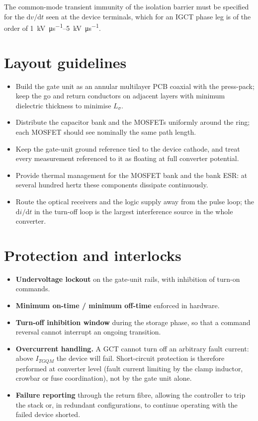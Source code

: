 \documentclass[11pt,a4paper]{report}
\begin{document}
The common-mode transient immunity of the isolation barrier must be specified for
the $\mathrm{d}v/\mathrm{d}t$ seen at the device terminals, which for an IGCT
phase leg is of the order of \SIrange{1}{5}{\kilo\volt\per\micro\second}.

\section{Layout guidelines}

\begin{itemize}[nosep]
  \item Build the gate unit as an annular multilayer PCB coaxial with the
        press-pack; keep the go and return conductors on adjacent layers with
        minimum dielectric thickness to minimise $L_{\sigma}$.
  \item Distribute the capacitor bank and the MOSFETs uniformly around the ring;
        each MOSFET should see nominally the same path length.
  \item Keep the gate-unit ground reference tied to the device cathode, and treat
        every measurement referenced to it as floating at full converter
        potential.
  \item Provide thermal management for the MOSFET bank and the bank ESR: at
        several hundred hertz these components dissipate continuously.
  \item Route the optical receivers and the logic supply away from the pulse
        loop; the $\mathrm{d}i/\mathrm{d}t$ in the turn-off loop is the largest
        interference source in the whole converter.
\end{itemize}

\section{Protection and interlocks}

\begin{itemize}[nosep]
  \item \textbf{Undervoltage lockout} on the gate-unit rails, with inhibition of
        turn-on commands.
  \item \textbf{Minimum on-time / minimum off-time} enforced in hardware.
  \item \textbf{Turn-off inhibition window} during the storage phase, so that a
        command reversal cannot interrupt an ongoing transition.
  \item \textbf{Overcurrent handling.} A GCT cannot turn off an arbitrary fault
        current: above $I_{TGQM}$ the device will fail. Short-circuit protection
        is therefore performed at converter level (fault current limiting by the
        clamp inductor, crowbar or fuse coordination), not by the gate unit
        alone.
  \item \textbf{Failure reporting} through the return fibre, allowing the
        controller to trip the stack or, in redundant configurations, to continue
        operating with the failed device shorted.
\end{itemize}
\end{document}
